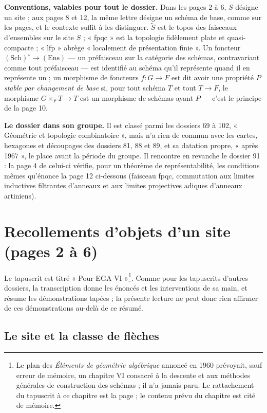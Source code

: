\documentclass[11pt,a4paper]{article}
\begin{document}
\textbf{Conventions, valables pour tout le dossier.} Dans les pages 2 à 6, $S$
désigne un site ; aux pages 8 et 12, la même lettre désigne un schéma de base,
comme sur les pages, et le contexte suffit à les distinguer. $\widetilde{S}$
est le topos des faisceaux d'ensembles sur le site $S$ ; « fpqc » est la
topologie fidèlement plate et quasi-compacte ; « lfp » abrège « localement de
présentation finie ». Un foncteur $(\mathrm{Sch})^{\circ} \to (\mathrm{Ens})$
— un préfaisceau sur la catégorie des schémas, contravariant comme tout
préfaisceau — est identifié au schéma qu'il représente quand il en représente
un ; un morphisme de foncteurs $f : G \to F$ est dit avoir une propriété $P$
\emph{stable par changement de base} si, pour tout schéma $T$ et tout
$T \to F$, le morphisme $G \times_F T \to T$ est un morphisme de schémas ayant $P$
— c'est le principe de la page 10.

\textbf{Le dossier dans son groupe.} Il est classé parmi les dossiers 69 à 102,
« Géométrie et topologie combinatoire », mais n'a rien de commun avec les cartes,
hexagones et découpages des dossiers 81, 88 et 89, et sa datation propre,
« après 1967 », le place avant la période du groupe. Il rencontre en revanche
le dossier 91 : la page 4 de celui-ci vérifie, pour un théorème de
représentabilité, les conditions mêmes qu'énonce la page 12 ci-dessous
(faisceau fpqc, commutation aux limites inductives filtrantes d'anneaux et aux
limites projectives adiques d'anneaux artiniens).

\section*{Recollements d'objets d'un site (pages 2 à 6)}

Le tapuscrit est titré « Pour EGA VI »\footnote{Le plan des \emph{Éléments de
géométrie algébrique} annoncé en 1960 prévoyait, sauf erreur de mémoire, un
chapitre VI consacré à la descente et aux méthodes générales de construction
des schémas ; il n'a jamais paru. Le rattachement du tapuscrit à ce chapitre
est la page ; le contenu prévu du chapitre est cité de mémoire.}. Comme pour
les tapuscrits d'autres dossiers, la transcription donne les énoncés et les
interventions de sa main, et résume les démonstrations tapées ; la présente
lecture ne peut donc rien affirmer de ces démonstrations au-delà de ce résumé.

\subsection*{Le site et la classe de flèches}
\end{document}
